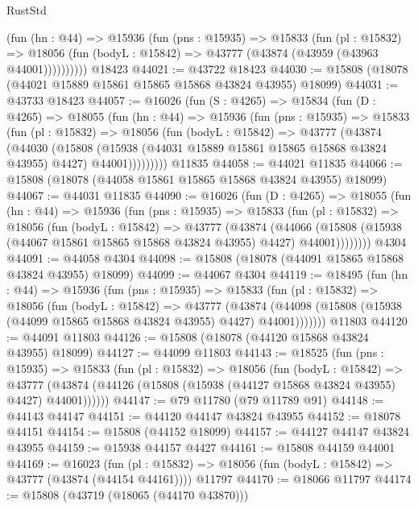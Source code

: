 \begin{lexlean}{RustStd}
\begin{coremodule}
          (fun (hn : @44) =>
          @15936
            (fun (pns : @15935) =>
            @15833
              (fun (pl : @15832) =>
              @18056 (fun (bodyL : @15842) => @43777 (@43874 (@43959 (@43963 @44001))))))))))
    @18423
@44021 := @43722 @18423
@44030 := @15808 (@18078 (@44021 @15889 @15861 @15865 @15868 @43824 @43955) @18099)
@44031 := @43733 @18423
@44057 := @16026
    (fun (S : @4265) =>
    @15834
      (fun (D : @4265) =>
      @18055
        (fun (hn : @44) =>
        @15936
          (fun (pns : @15935) =>
          @15833
            (fun (pl : @15832) =>
            @18056
              (fun (bodyL : @15842) =>
              @43777
                (@43874
                  (@44030
                    (@15808
                      (@15938 (@44031 @15889 @15861 @15865 @15868 @43824 @43955) @4427)
                      @44001)))))))))
    @11835
@44058 := @44021 @11835
@44066 := @15808 (@18078 (@44058 @15861 @15865 @15868 @43824 @43955) @18099)
@44067 := @44031 @11835
@44090 := @16026
    (fun (D : @4265) =>
    @18055
      (fun (hn : @44) =>
      @15936
        (fun (pns : @15935) =>
        @15833
          (fun (pl : @15832) =>
          @18056
            (fun (bodyL : @15842) =>
            @43777
              (@43874
                (@44066
                  (@15808 (@15938 (@44067 @15861 @15865 @15868 @43824 @43955) @4427) @44001))))))))
    @4304
@44091 := @44058 @4304
@44098 := @15808 (@18078 (@44091 @15865 @15868 @43824 @43955) @18099)
@44099 := @44067 @4304
@44119 := @18495
    (fun (hn : @44) =>
    @15936
      (fun (pns : @15935) =>
      @15833
        (fun (pl : @15832) =>
        @18056
          (fun (bodyL : @15842) =>
          @43777
            (@43874
              (@44098 (@15808 (@15938 (@44099 @15865 @15868 @43824 @43955) @4427) @44001)))))))
    @11803
@44120 := @44091 @11803
@44126 := @15808 (@18078 (@44120 @15868 @43824 @43955) @18099)
@44127 := @44099 @11803
@44143 := @18525
    (fun (pns : @15935) =>
    @15833
      (fun (pl : @15832) =>
      @18056
        (fun (bodyL : @15842) =>
        @43777 (@43874 (@44126 (@15808 (@15938 (@44127 @15868 @43824 @43955) @4427) @44001))))))
@44147 := @79 @11780 (@79 @11789 @91)
@44148 := @44143 @44147
@44151 := @44120 @44147 @43824 @43955
@44152 := @18078 @44151
@44154 := @15808 (@44152 @18099)
@44157 := @44127 @44147 @43824 @43955
@44159 := @15938 @44157 @4427
@44161 := @15808 @44159 @44001
@44169 := @16023
    (fun (pl : @15832) => @18056 (fun (bodyL : @15842) => @43777 (@43874 (@44154 @44161))))
    @11797
@44170 := @18066 @11797
@44174 := @15808 (@43719 (@18065 (@44170 @43870)))

\end{coremodule}
\end{lexlean}
